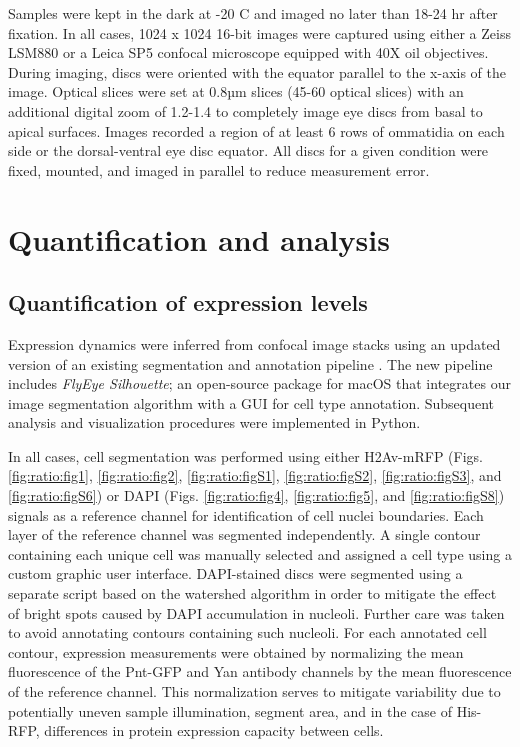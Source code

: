 Samples were kept in the dark at -20 \textdegree{}C and imaged no later than 18-24 hr after fixation. In all cases, 1024 x 1024 16-bit images were captured using either a Zeiss LSM880 or a Leica SP5 confocal microscope equipped with 40X oil objectives. During imaging, discs were oriented with the equator parallel to the x-axis of the image. Optical slices were set at 0.8µm slices (45-60 optical slices) with an additional digital zoom of 1.2-1.4 to completely image eye discs from basal to apical surfaces. Images recorded a region of at least 6 rows of ommatidia on each side or the dorsal-ventral eye disc equator. All discs for a given condition were fixed, mounted, and imaged in parallel to reduce measurement error.

\section{Quantification and analysis}

\subsection{Quantification of expression levels}
\label{appendix:methods:ratio:quantification}

Expression dynamics were inferred from confocal image stacks using an updated version of an existing segmentation and annotation pipeline \cite{Pelaez2015a}. The new pipeline includes \textit{FlyEye Silhouette}; an open-source package for macOS that integrates our image segmentation algorithm with a GUI for cell type annotation. Subsequent analysis and visualization procedures were implemented in Python.

In all cases, cell segmentation was performed using either H2Av-mRFP (Figs. \ref{fig:ratio:fig1}, \ref{fig:ratio:fig2}, \ref{fig:ratio:figS1}, \ref{fig:ratio:figS2}, \ref{fig:ratio:figS3}, and \ref{fig:ratio:figS6}) or DAPI (Figs. \ref{fig:ratio:fig4}, \ref{fig:ratio:fig5}, and \ref{fig:ratio:figS8}) signals as a reference channel for identification of cell nuclei boundaries. Each layer of the reference channel was segmented independently. A single contour containing each unique cell was manually selected and assigned a cell type using a custom graphic user interface. DAPI-stained discs were segmented using a separate script based on the watershed algorithm in order to mitigate the effect of bright spots caused by DAPI accumulation in nucleoli. Further care was taken to avoid annotating contours containing such nucleoli. For each annotated cell contour, expression measurements were obtained by normalizing the mean fluorescence of the Pnt-GFP and Yan antibody channels by the mean fluorescence of the reference channel. This normalization serves to mitigate variability due to potentially uneven sample illumination, segment area, and in the case of His-RFP, differences in protein expression capacity between cells.

